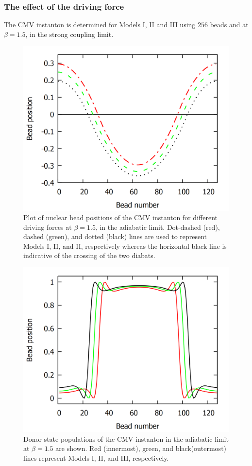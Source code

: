 \documentclass[%
 aip,
 jmp,%
 amsmath,amssymb,
reprint,%
]{revtex4-1}
\begin{document}
\subsubsection{\label{sssec:level5A2} The effect of the driving force}
The CMV instanton is determined for Models I, II and III using $256$ beads and at $\beta=1.5$, in the strong coupling limit. 
\begin{figure}[ht!]
\centering
\includegraphics[scale=0.16]{MV-Adia-Ins-b15-shifted2.png}
\caption{Plot of nuclear bead positions of the CMV instanton for different driving forces at $\beta=1.5$, in the adiabatic limit. Dot-dashed (red), dashed (green), and dotted (black) lines are used to represent Models I, II, and II, respectively whereas the horizontal black line is indicative of the crossing of the two diabats. } \label{fig:AdiaInsAllModels}
\end{figure}
\begin{figure}[ht!]
\centering
\includegraphics[scale=0.16]{MV-Adia-Pop-b15-combined-lines2.png}
\caption{Donor state populations of the CMV instanton in the adiabatic limit at $\beta=1.5$ are shown. Red (innermost), green, and black(outermost) lines represent Models I, II, and III, respectively.  } \label{fig:DSPopAdiaCMV}
\end{figure}
\end{document}
